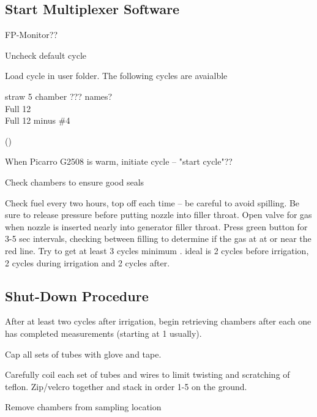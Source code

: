 \documentclass[12pt]{../SOP3}\usepackage[]{graphicx}\usepackage[]{color}
\begin{document}
\subsection*{Start Multiplexer Software}

\NP FP-Monitor??
                               
\NP Uncheck default cycle
                               
\NP Load cycle in user folder. The following cycles are avaialble 

\begin{description}
  \item[straw 5 chamber ??? names?]
  \item[Full 12]
  \item[Full 12 minus \#4]
\end{description}
()
                               
\NP When Picarro G2508 is warm, initiate cycle -- "start cycle"??
                               
\NP Check chambers to ensure good seals
                               
\NP Check fuel every two hours, top off each time -- be careful to avoid spilling. Be sure to release pressure before putting nozzle into filler throat. Open valve for gas when nozzle is inserted nearly into generator filler throat. Press green button for 3-5 sec intervals, checking between filling to determine if the gas at at or near the red line.
                               Try to get at least 3 cycles minimum . ideal is 2 cycles before irrigation, 2 cycles during irrigation and 2 cycles after. 
                               
\subsection*{Shut-Down Procedure}
                               
\NP After at least two cycles after irrigation, begin retrieving chambers after each one has completed measurements (starting at 1 usually).
                               
\NP Cap all sets of tubes with glove and tape.
                               
\NP Carefully coil each set of tubes and wires to limit twisting and scratching of teflon. Zip/velcro together and stack in order 1-5 on the ground. 
                               
\NP Remove chambers from sampling location
                               
\end{document}
